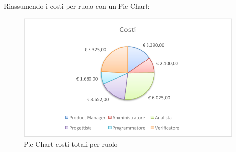 				Riassumendo i costi per ruolo con un Pie Chart:
				\begin{figure}[H]\centering
					\includegraphics[width=\textwidth]{PianoDiProgetto/Pics/ChartTotCosti.pdf}
					\caption{Pie Chart costi totali per ruolo}
				\end{figure}
